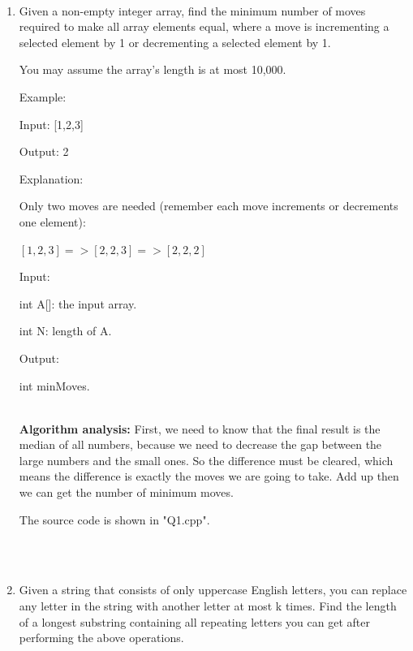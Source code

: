 \documentclass[12pt,a4paper]{article}
\begin{document}
\noindent

\noindent{}
~\\
\begin{enumerate}

\item Given a non-empty integer array, find the minimum number of moves required to make all array elements equal, where a move is incrementing a selected element by 1 or decrementing a selected element by 1.

You may assume the array's length is at most 10,000.

Example:

Input:
[1,2,3]

Output:
2

Explanation:

Only two moves are needed (remember each move increments or decrements one element):

$[1,2,3] => [2,2,3] => [2,2,2]$

Input:

int A[]: the input array.

int N: length of A.

Output:

int minMoves.

~\\

\textbf{Algorithm analysis:}
First, we need to know that the final result is the median of all numbers, because we need to decrease the gap between the large numbers and the small ones. So the difference must be cleared, which means the difference is exactly the moves we are going to take. Add up then we can get the number of minimum moves.

The source code is shown in "Q1.cpp".

~\\
~\\


\item Given a string that consists of only uppercase English letters, you can replace any letter in the string with another letter at most k times. Find the length of a longest substring containing all repeating letters you can get after performing the above operations.


\end{enumerate}
\end{document}
